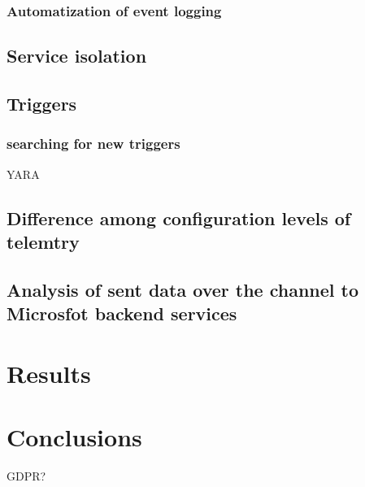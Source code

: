 \documentclass[11pt,a4paper,twoside]{tesis}
\begin{document}
\subsubsection*{Automatization of event logging}
\subsection*{Service isolation}
\subsection*{Triggers}
\subsubsection*{searching for new triggers} YARA
\subsection*{Difference among configuration levels of telemtry}
\subsection*{Analysis of sent data over the channel to Microsfot backend services}

\section*{Results}
\section*{Conclusions}
GDPR?
\end{document}
